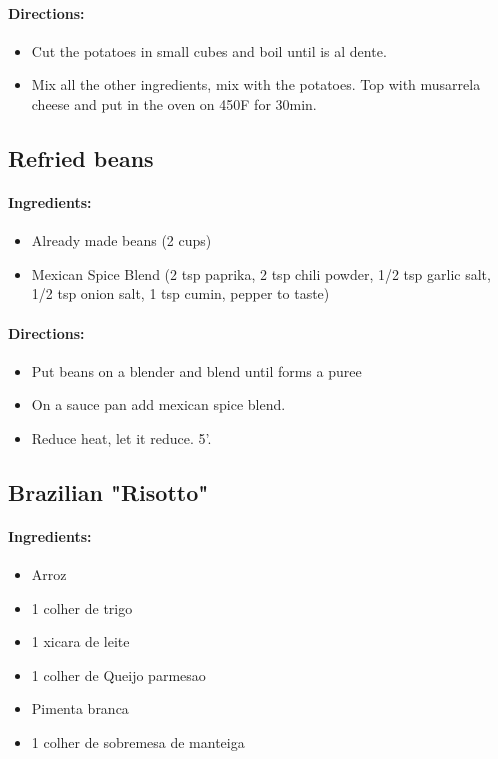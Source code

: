\documentclass{article}
\begin{document}
\paragraph{Directions:}
\begin{itemize}
    \item Cut the potatoes in small cubes and boil until is al dente.
    \item Mix all the other ingredients, mix with the potatoes. Top with musarrela cheese and put in the oven on 450F for 30min.
\end{itemize}

\subsection{Refried beans}

\paragraph{Ingredients:}
\begin{itemize}
    \item Already made beans (2 cups)
    \item Mexican Spice Blend (2 tsp paprika, 2 tsp chili powder, 1/2 tsp garlic salt, 1/2 tsp onion salt, 1 tsp cumin, pepper to taste)
\end{itemize}

\paragraph{Directions:}
\begin{itemize}
    \item Put beans on a blender and blend until forms a puree
    \item On a sauce pan add mexican spice blend.
    \item Reduce heat, let it reduce. 5'.
\end{itemize}

\subsection{Brazilian "Risotto"}

\paragraph{Ingredients:}
\begin{itemize}
    \item Arroz
    \item 1 colher de trigo
    \item 1 xicara de leite
    \item 1 colher de Queijo parmesao
    \item Pimenta branca
    \item 1 colher de sobremesa de manteiga
\end{itemize}
\end{document}
